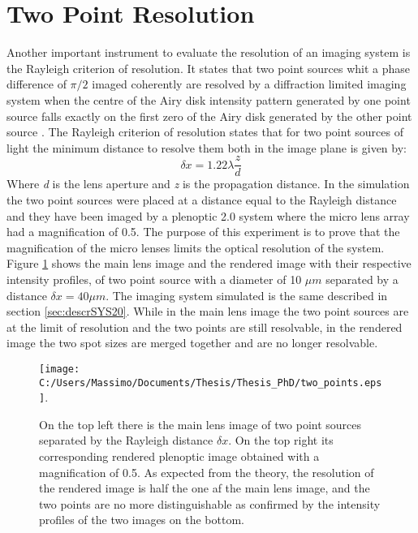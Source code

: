 \section{Two Point Resolution}
\label{sec:two}
Another important instrument to evaluate the resolution of an imaging system is the Rayleigh criterion of resolution. It states that two point sources whit a phase difference of $\pi/2$ imaged coherently  are resolved by a diffraction limited imaging system when the centre of the Airy disk intensity pattern generated by one point source falls exactly on the first zero of the Airy disk generated by the other point source \cite{goodman2005introduction}. The Rayleigh criterion of resolution states that for two point sources of light the minimum distance to resolve them both in the image plane is given  by:
\begin{equation}
	\label{eq:rayleigh}
	\delta x = 1.22\lambda\dfrac{z}{d}
\end{equation}
Where \textit{d} is the lens aperture and \textit{z} is the propagation distance.
In the simulation the two point sources were placed at a distance equal to the Rayleigh distance and they have been imaged by a plenoptic 2.0 system where the micro lens array had a magnification of 0.5. The purpose of this experiment is to prove that the magnification of the micro lenses limits the optical resolution of the system. 
Figure \ref{fig:twopoint1} shows the main lens image and the rendered image with their respective intensity profiles, of two point source with a diameter of 10 $\mu m$ separated by a distance $\delta x = 40 \mu m$. The imaging system simulated is the same described in section \ref{sec:descrSYS20}.
While in the main lens image the two point sources are at the limit of resolution and the two points are still resolvable, in the rendered image the two spot sizes are merged together and are no longer resolvable.
\begin{figure}[H]
	\centering
	\texttt{[image: C:/Users/Massimo/Documents/Thesis/Thesis\_PhD/two\_points.eps]}.
	\caption{\label{fig:twopoint1} On the top left there is the main lens image of two point sources separated by the Rayleigh distance $\delta x$. On the top right its corresponding rendered plenoptic image obtained with a magnification of 0.5. As expected from the theory, the resolution of the rendered image is half the one af the main lens image, and the two points are no more distinguishable as confirmed by the intensity profiles of the two images on the bottom.   }
\end{figure}
